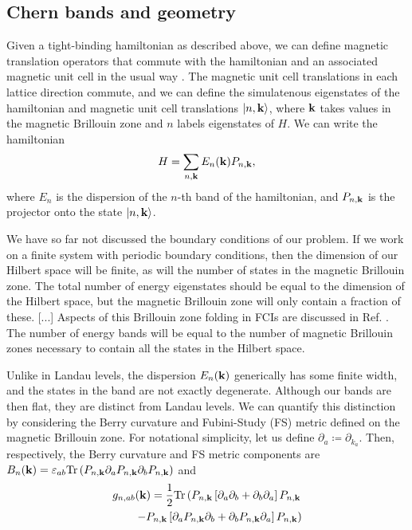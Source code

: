 \documentclass[aps,prb,twocolumn,letterpaper,twoside,nobalancelastpage,groupedaddress,amsmath,amssymb,floatfix,citeautoscript]{revtex4-1}
\begin{document}
\subsection{Chern bands and geometry}
Given a tight-binding hamiltonian as described above, we can define magnetic translation operators that commute with the hamiltonian and an associated magnetic unit cell in the usual way \cite{FradkinBook}. The magnetic unit cell translations in each lattice direction commute, and we can define the simulatenous eigenstates of the hamiltonian and magnetic unit cell translations $\ket{n,{\bf k}}$, where ${\bf k}$ takes values in the magnetic Brillouin zone and $n$ labels eigenstates of $H$. We can write the hamiltonian 
\begin{align*}
H = \sum_{n,\mathbf{k}} E_{n}({\bf k}) P_{n,{\bf k}},
\end{align*}
where $E_n$ is the dispersion of the $n$-th band of the hamiltonian, and $P_{n,{\bf k}}$ is the projector onto the state $\ket{n,{\bf k}}$.

We have so far not discussed the boundary conditions of our problem. If we work on a finite system with periodic boundary conditions, then the dimension of our Hilbert space will be finite, as will the number of states in the magnetic Brillouin zone. The total number of energy eigenstates should be equal to the dimension of the Hilbert space, but the magnetic Brillouin zone will only contain a fraction of these. [...] Aspects of this Brillouin zone folding in FCIs are discussed in Ref. . The number of energy bands will be equal to the number of magnetic Brillouin zones necessary to contain all the states in the Hilbert space.

Unlike in Landau levels, the dispersion $E_{n}({\bf k})$ generically has some finite width, and the states in the band are not exactly degenerate. 
 Although our bands are then flat, they are distinct from Landau levels. We can quantify this distinction by considering the Berry curvature and Fubini-Study (FS) metric defined on the magnetic Brillouin zone. For notational simplicity, let us define $\partial_a \coloneqq \partial_{k_a}$. Then, respectively, the Berry curvature and FS metric components are $B_n({\bf k}) = \varepsilon_{ab}\text{Tr}\left(P_{n,{\bf k}}\partial_{a}P_{n,{\bf k}}\partial_b P_{n,{\bf k}}\right)$ and
\begin{align*}
g_{n,ab}({\bf k}) = \frac{1}{2}\text{Tr}\left(P_{n,{\bf k}}\left[\partial_a\partial_b + \partial_b \partial_a\right]P_{n,{\bf k}}\right.\\
\left. \quad\quad-P_{n,{\bf k}}\left[\partial_aP_{n,{\bf k}}\partial_b+ \partial_bP_{n,{\bf k}}\partial_a\right] P_{n,{\bf k}}\right)
\end{align*}
\end{document}
